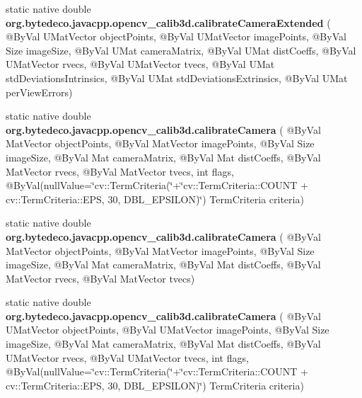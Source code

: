 \begin{DoxyCompactItemize}
\item 
\mbox{\label{group__calib3d_ga899a314f355e4916181de0c4419d1e50}} 
static native double {\bfseries org.\+bytedeco.\+javacpp.\+opencv\+\_\+calib3d.\+calibrate\+Camera\+Extended} ( @By\+Val U\+Mat\+Vector object\+Points, @By\+Val U\+Mat\+Vector image\+Points, @By\+Val Size image\+Size, @By\+Val U\+Mat camera\+Matrix, @By\+Val U\+Mat dist\+Coeffs, @By\+Val U\+Mat\+Vector rvecs, @By\+Val U\+Mat\+Vector tvecs, @By\+Val U\+Mat std\+Deviations\+Intrinsics, @By\+Val U\+Mat std\+Deviations\+Extrinsics, @By\+Val U\+Mat per\+View\+Errors)
\item 
\mbox{\label{group__calib3d_ga587688c30baed892505352f33bbb7fd0}} 
static native double {\bfseries org.\+bytedeco.\+javacpp.\+opencv\+\_\+calib3d.\+calibrate\+Camera} ( @By\+Val Mat\+Vector object\+Points, @By\+Val Mat\+Vector image\+Points, @By\+Val Size image\+Size, @By\+Val Mat camera\+Matrix, @By\+Val Mat dist\+Coeffs, @By\+Val Mat\+Vector rvecs, @By\+Val Mat\+Vector tvecs, int flags, @By\+Val(null\+Value=\char`\"{}cv\+::\+Term\+Criteria(\char`\"{}+\char`\"{}cv\+::\+Term\+Criteria\+::\+C\+O\+U\+NT + cv\+::\+Term\+Criteria\+::\+E\+PS, 30, D\+B\+L\+\_\+\+E\+P\+S\+I\+L\+ON)\char`\"{}) Term\+Criteria criteria)
\item 
\mbox{\label{group__calib3d_gad6f380fb4142ebcf5e0f997a36e3b829}} 
static native double {\bfseries org.\+bytedeco.\+javacpp.\+opencv\+\_\+calib3d.\+calibrate\+Camera} ( @By\+Val Mat\+Vector object\+Points, @By\+Val Mat\+Vector image\+Points, @By\+Val Size image\+Size, @By\+Val Mat camera\+Matrix, @By\+Val Mat dist\+Coeffs, @By\+Val Mat\+Vector rvecs, @By\+Val Mat\+Vector tvecs)
\item 
\mbox{\label{group__calib3d_ga4eb65095de3a2342e732c3c7b3c8c591}} 
static native double {\bfseries org.\+bytedeco.\+javacpp.\+opencv\+\_\+calib3d.\+calibrate\+Camera} ( @By\+Val U\+Mat\+Vector object\+Points, @By\+Val U\+Mat\+Vector image\+Points, @By\+Val Size image\+Size, @By\+Val Mat camera\+Matrix, @By\+Val Mat dist\+Coeffs, @By\+Val U\+Mat\+Vector rvecs, @By\+Val U\+Mat\+Vector tvecs, int flags, @By\+Val(null\+Value=\char`\"{}cv\+::\+Term\+Criteria(\char`\"{}+\char`\"{}cv\+::\+Term\+Criteria\+::\+C\+O\+U\+NT + cv\+::\+Term\+Criteria\+::\+E\+PS, 30, D\+B\+L\+\_\+\+E\+P\+S\+I\+L\+ON)\char`\"{}) Term\+Criteria criteria)
\item 

\end{DoxyCompactItemize}
